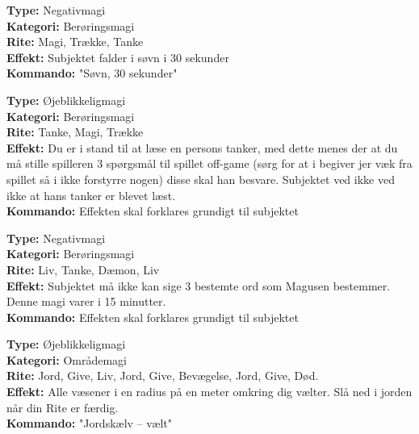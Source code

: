 \begin{lærmagi*}[Søvn]
\textbf{Type:} Negativmagi\\
\textbf{Kategori:} Berøringsmagi\\
\textbf{Rite:} Magi, Trække, Tanke\\
\textbf{Effekt:} Subjektet falder i søvn i 30 sekunder\\
\textbf{Kommando:} "Søvn, 30 sekunder"\\
\end{lærmagi*}

\begin{lærmagi*}
\textbf{Type:} Øjeblikkeligmagi\\
\textbf{Kategori:} Berøringsmagi\\
\textbf{Rite:} Tanke, Magi, Trække\\
\textbf{Effekt:} Du er i stand til at læse en persons tanker, med dette menes der at du må stille spilleren 3 spørgsmål til spillet off-game (sørg for at i begiver jer væk fra spillet så i ikke forstyrre nogen) disse skal han besvare. Subjektet ved ikke ved ikke at hans tanker er blevet læst.\\
\textbf{Kommando:} Effekten skal forklares grundigt til subjektet\\
\end{lærmagi*}

\begin{lærmagi*}
\textbf{Type:} Negativmagi\\
\textbf{Kategori:} Berøringsmagi\\
\textbf{Rite:} Liv, Tanke, Dæmon, Liv\\
\textbf{Effekt:} Subjektet må ikke kan sige 3 bestemte ord som Magusen bestemmer. Denne magi varer i 15 minutter.\\
\textbf{Kommando:} Effekten skal forklares grundigt til subjektet\\
\end{lærmagi*}

\begin{lærmagi*}[Jordskælv]
\textbf{Type:} Øjeblikkeligmagi\\
\textbf{Kategori:} Områdemagi\\
\textbf{Rite:}  Jord, Give, Liv, Jord, Give, Bevægelse, Jord, Give, Død.\\
\textbf{Effekt:} Alle væsener i en radius på en meter omkring dig vælter. Slå ned i jorden når din Rite er færdig.\\
\textbf{Kommando:} "Jordskælv – vælt"\\
\end{lærmagi*}

